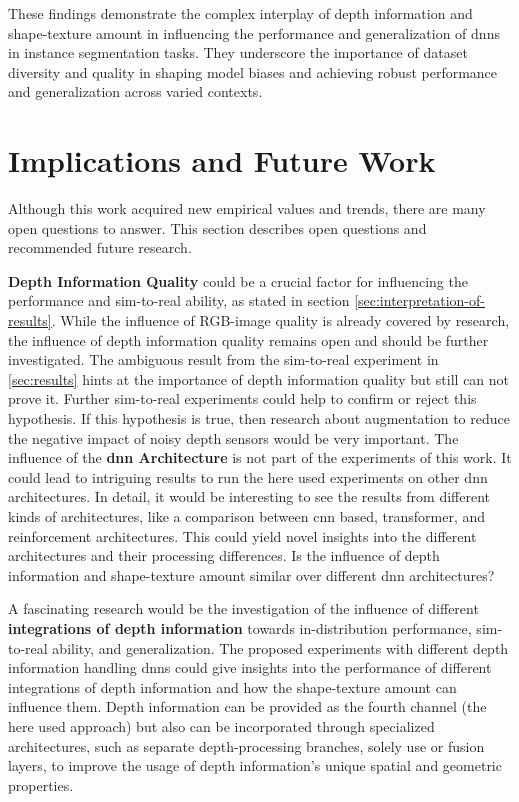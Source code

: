 		These findings demonstrate the complex interplay of depth information and shape-texture amount in influencing the performance and generalization of \ac{dnn}s in instance segmentation tasks. They underscore the importance of dataset diversity and quality in shaping model biases and achieving robust performance and generalization across varied contexts.
	
	
	\section{Implications and Future Work}
	\label{sec:implications-and-future-work}
		Although this work acquired new empirical values and trends, there are many open questions to answer. This section describes open questions and recommended future research.
		
		\textbf{Depth Information Quality} could be a crucial factor for influencing the performance and sim-to-real ability, as stated in section \ref{sec:interpretation-of-results}. While the influence of RGB-image quality is already covered by research, the influence of depth information quality remains open and should be further investigated. The ambiguous result from the sim-to-real experiment in \ref{sec:results} hints at the importance of depth information quality but still can not prove it. Further sim-to-real experiments could help to confirm or reject this hypothesis. If this hypothesis is true, then research about augmentation to reduce the negative impact of noisy depth sensors would be very important.
		\clearpage
		The influence of the \textbf{\ac{dnn} Architecture} is not part of the experiments of this work. It could lead to intriguing results to run the here used experiments on other \ac{dnn} architectures. In detail, it would be interesting to see the results from different kinds of architectures, like a comparison between \ac{cnn} based, transformer, and reinforcement architectures. This could yield novel insights into the different architectures and their processing differences. Is the influence of depth information and shape-texture amount similar over different \ac{dnn} architectures?
		
		A fascinating research would be the investigation of the influence of different \textbf{integrations of depth information} towards in-distribution performance, sim-to-real ability, and generalization. The proposed experiments with different depth information handling \ac{dnn}s could give insights into the performance of different integrations of depth information and how the shape-texture amount can influence them. Depth information can be provided as the fourth channel (the here used approach) but also can be incorporated through specialized architectures, such as separate depth-processing branches, solely use or fusion layers, to improve the usage of depth information's unique spatial and geometric properties.
		

